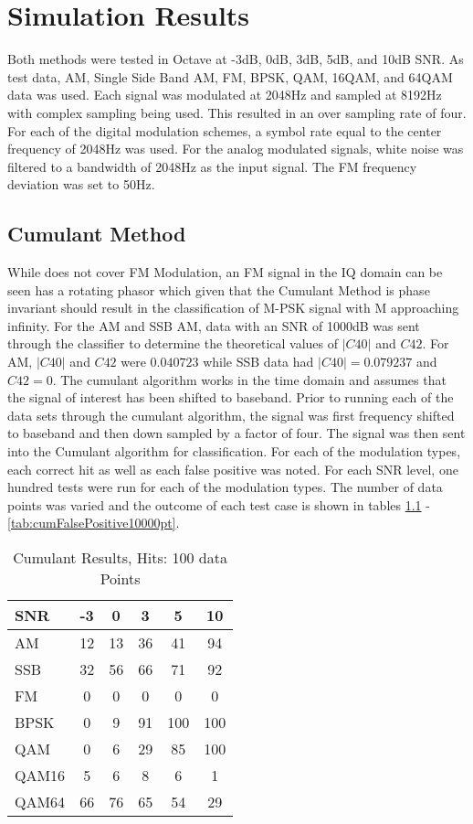 \chapter{Simulation Results}

Both methods were tested in Octave at -3dB, 0dB, 3dB, 5dB, and 10dB SNR.  As
test data, AM, Single Side Band AM, FM, BPSK, QAM, 16QAM, and 64QAM data was
used.  Each signal was modulated at 2048Hz and sampled at 8192Hz with complex
sampling being used.  This resulted in an over sampling rate of four.  For each
of the digital modulation schemes, a symbol rate equal to the center frequency
of 2048Hz was used.  For the analog modulated signals, white noise was filtered
to a bandwidth of 2048Hz as the input signal.  The FM frequency deviation was
set to 50Hz.

\section{Cumulant Method}

While \cite{swami2000} does not cover FM Modulation, an FM signal in the IQ
domain can be seen has a rotating phasor which given that the Cumulant Method is
phase invariant should result in the classification of M-PSK signal with M
approaching infinity.  
For the AM and SSB AM, data with an SNR of 1000dB was sent through the
classifier to determine the theoretical values of $|C40|$ and $C42$.  For AM,
$|C40|$ and $C42$ were $0.040723$ while SSB data had $|C40| = 0.079237$ and
$C42 = 0$.
The cumulant algorithm works in the time domain and assumes that the signal of
interest has been shifted to baseband.  Prior to running each of the data sets
through the cumulant algorithm, the signal was first frequency shifted to
baseband and then down sampled by a factor of four.  The signal was then sent
into the Cumulant algorithm for classification.  For each of the modulation
types, each correct hit as well as each false positive was noted.  For each
SNR level, one hundred tests were run for each of the modulation types.  The
number of data points was varied and the outcome of each test case is shown in
tables \ref{tab:cumHit100pt} - \ref{tab:cumFalsePositive10000pt}.

\begin{table}
\caption{Cumulant Results, Hits: 100 data Points}
\centering
\begin{tabular}{ l | c | c | c | c | c } \hline
SNR &	 -3 &	 0 &	 3 &	 5 &	 10\\ \hline \hline 
AM &	 12 &	 13 &	 36 &	 41 &	 94 \\ \hline 
SSB &	 32 &	 56 &	 66 &	 71 &	 92 \\ \hline 
FM &	 0 &	 0 &	 0 &	 0 &	 0 \\ \hline 
BPSK &	 0 &	 9 &	 91 &	 100 &	 100 \\ \hline 
QAM &	 0 &	 6 &	 29 &	 85 &	 100 \\ \hline 
QAM16 &	 5 &	 6 &	 8 &	 6 &	 1 \\ \hline 
QAM64 &	 66 &	 76 &	 65 &	 54 &	 29 \\ \hline
\end{tabular}
\label{tab:cumHit100pt}
\end{table}

